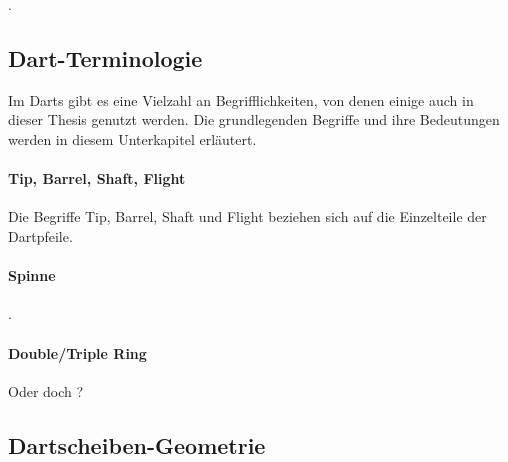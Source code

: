 .



\subsection{Dart-Terminologie}
\label{sec:dart_terminologie}

Im Darts gibt es eine Vielzahl an Begrifflichkeiten, von denen einige auch in dieser Thesis genutzt werden. Die grundlegenden Begriffe und ihre Bedeutungen werden in diesem Unterkapitel erläutert.

\paragraph{Tip, Barrel, Shaft, Flight}

Die Begriffe Tip, Barrel, Shaft und Flight beziehen sich auf die Einzelteile der Dartpfeile. 

\paragraph{Spinne}

.

\paragraph{Double/Triple Ring}

Oder doch ?



\subsection{Dartscheiben-Geometrie}
\label{sec:dartscheiben_geometrie}


